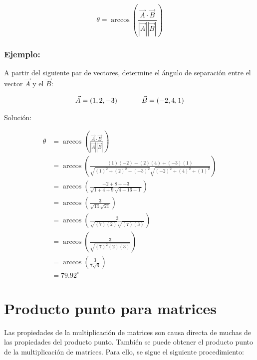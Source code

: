 \documentclass{article}
\begin{document}
        \begin{equation}
            \theta=\arccos \left(\frac{\vec{A} \cdot \vec{B}}{|\vec{A}||\vec{B}|}\right)
        \end{equation}

        \subsubsection*{Ejemplo:}

            A partir del siguiente par de vectores, determine el ángulo de separación entre el vector $\vec{A}$ y el  $\vec{B}$:

            \begin{gather*}
                \vec{A}=(1,2,-3) \hspace*{35 pt} \vec{B}=(-2,4,1)
            \end{gather*}
        
            Solución:

            \begin{equation}
                \begin{aligned}
                \theta &=\arccos \left(\frac{\vec{A} \cdot \vec{B}}{|\vec{A}||\vec{B}|}\right) \\
                &=\arccos \left(\frac{(1)(-2)+(2)(4)+(-3)(1)}{\sqrt{(1)^{2}+(2)^{2}+(-3)^{2}} \sqrt{(-2)^{2}+(4)^{2}+(1)^{2}}}\right) \\
                &=\arccos \left(\frac{-2+8+-3}{\sqrt{1+4+9} \sqrt{4+16+1}}\right) \\
                &=\arccos \left(\frac{3}{\sqrt{14} \sqrt{21}}\right) \\
                &=\arccos \left(\frac{3}{\sqrt{(7)(2)} \sqrt{(7)(3)}}\right) \\
                &=\arccos \left(\frac{3}{\sqrt{(7)^{2}(2)(3)}}\right) \\
                &=\arccos \left(\frac{3}{7 \sqrt{6}}\right) \\
                &=79.92^{\circ}
                \end{aligned}
            \end{equation}

\section{Producto punto para matrices}

    Las propiedades de la multiplicación de matrices son causa directa de muchas de las propiedades del producto punto. También se puede obtener el producto punto de la multiplicación de matrices. Para ello, se sigue el siguiente procedimiento:
\end{document}
